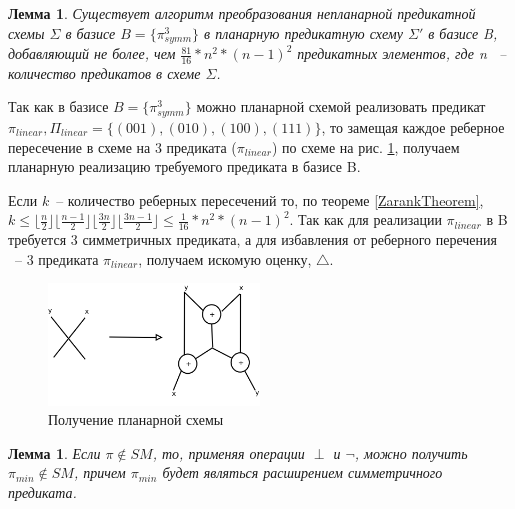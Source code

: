 \documentclass[12pt]{article}
\newtheorem{lemma}[theorem]{Лемма}
\newenvironment{proof}[1][Доказательство]{\begin{trivlist}
\item[\hskip \labelsep {\bfseries #1}]}{\end{trivlist}}
\begin{document}
\label{planar_basis}
\begin{lemma}
\label{eq:planar_algo}
Существует алгоритм преобразования непланарной предикатной схемы $\Sigma$ в базисе $B=\{\pi_{symm}^3\}$
в планарную предикатную схему $\Sigma'$ в базисе B, добавляющий не более, чем 
$\frac{81}{16} * n^2*(n-1)^2 $ предикатных элементов, где n ~-- количество предикатов в схеме $\Sigma$.
\end{lemma}
\begin{proof}
Так как в базисе $B=\{\pi_{symm}^3\}$ можно планарной схемой реализовать предикат 
$\pi_{linear}, \Pi_{linear} = \{ (001), (010), (100), (111) \}$, то замещая каждое реберное пересечение в схеме на 
3 предиката ($\pi_{linear}$) по схеме на рис. \ref{fig:xor}, получаем планарную реализацию требуемого предиката
в базисе B.

Если $k$~-- количество реберных пересечений то, по теореме \ref{ZarankTheorem}, 
$k \leq \lfloor \frac{n}{2} \rfloor \lfloor \frac{n-1}{2} \rfloor \lfloor \frac{3n}{2} \rfloor \lfloor \frac{3n-1}{2} \rfloor \le \frac{1}{16} * n^2*(n-1)^2$.
Так как для реализации $\pi_{linear}$ в B требуется 3 симметричных предиката, а для избавления
от реберного перечения ~-- 3 предиката $\pi_{linear}$, получаем искомую оценку, $\bigtriangleup$.

\end{proof}

\begin{figure}[htb]
\centering
\includegraphics[width=0.5\textwidth]{intersection.png}
\caption{Получение планарной схемы}
\label{fig:xor}
\end{figure}


\begin{lemma}
\label{eq:lemma_sm}
Если $\pi \notin SM$, то, применяя операции $\perp$ и $\neg$,
можно получить $\pi_{min} \notin SM$, причем $\pi_{min}$ будет являться расширением симметричного предиката.
\end{lemma}
\end{document}
